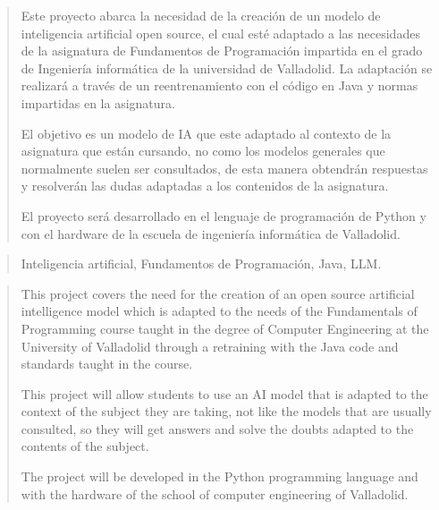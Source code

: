\documentclass[a4paper,12pt,twoside]{memoir}
\begin{document}



\newpage\null\thispagestyle{empty}\newpage




\frontmatter

\renewcommand*\abstractname{Resumen}
\begin{abstract}
Este proyecto abarca la necesidad de la creación de un modelo de inteligencia artificial open source, el cual esté adaptado a las necesidades de la asignatura de Fundamentos de Programación impartida en el grado de Ingeniería informática de la universidad de Valladolid. La adaptación se realizará a través de un reentrenamiento con el código en Java y normas impartidas en la asignatura. 

El objetivo es un modelo de IA que este adaptado al contexto de la asignatura que están cursando, no como los modelos generales que normalmente suelen ser consultados, de esta manera obtendrán respuestas y resolverán las dudas adaptadas a los contenidos de la asignatura.

El proyecto será desarrollado en el lenguaje de programación de Python y con el hardware de la escuela de ingeniería informática de Valladolid.
\end{abstract}

\renewcommand*\abstractname{Descriptores}
\begin{abstract}
Inteligencia artificial, Fundamentos de Programación, Java,  LLM.
\end{abstract}

\clearpage

\renewcommand*\abstractname{Abstract}
\begin{abstract}
This project covers the need for the creation of an open source artificial intelligence model which is adapted to the needs of the Fundamentals of Programming course taught in the degree of Computer Engineering at the University of Valladolid through a retraining with the Java code and standards taught in the course.

This project will allow students to use an AI model that is adapted to the context of the subject they are taking, not like the models that are usually consulted, so they will get answers and solve the doubts adapted to the contents of the subject.

The project will be developed in the Python programming language and with the hardware of the school of computer engineering of Valladolid.
\end{abstract}
\end{document}
